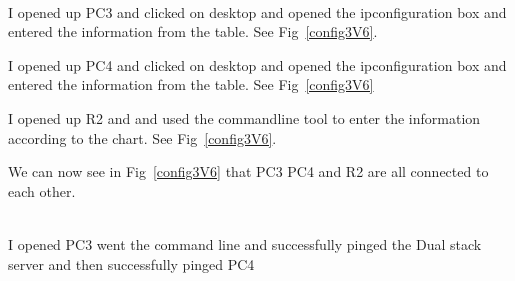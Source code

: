 \documentclass[../EngineeringJournal_CDavis.tex]{subfiles}
\begin{document}
\noindent{}\\
I opened up PC3 and clicked on desktop and opened the ipconfiguration box and
entered the information from the table. See Fig~\ref{config3V6}.


\noindent I opened up PC4 and clicked on desktop and opened the ipconfiguration box and entered
the information from the table. See Fig~\ref{config3V6}


\noindent I opened up R2 and and used the commandline tool to enter the information according to
the chart. See Fig~\ref{config3V6}.


\noindent We can now see in Fig~\ref{config3V6} that PC3 PC4 and R2 are all connected to each other. 

\clearpage

\noindent{}\\
I opened PC3 went the command line and successfully pinged the Dual stack server and then successfully pinged PC4
\end{document}
